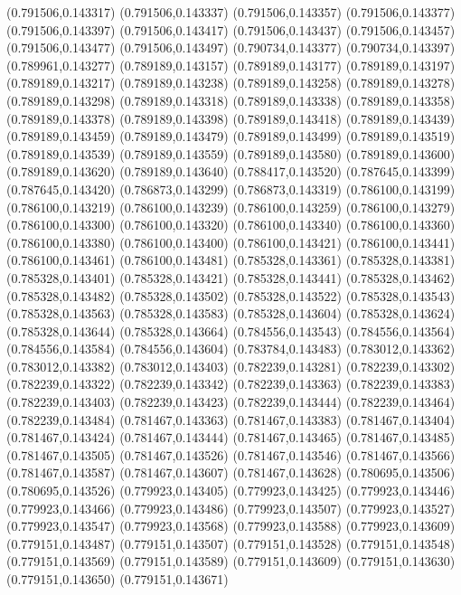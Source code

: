 (0.791506,0.143317)
(0.791506,0.143337)
(0.791506,0.143357)
(0.791506,0.143377)
(0.791506,0.143397)
(0.791506,0.143417)
(0.791506,0.143437)
(0.791506,0.143457)
(0.791506,0.143477)
(0.791506,0.143497)
(0.790734,0.143377)
(0.790734,0.143397)
(0.789961,0.143277)
(0.789189,0.143157)
(0.789189,0.143177)
(0.789189,0.143197)
(0.789189,0.143217)
(0.789189,0.143238)
(0.789189,0.143258)
(0.789189,0.143278)
(0.789189,0.143298)
(0.789189,0.143318)
(0.789189,0.143338)
(0.789189,0.143358)
(0.789189,0.143378)
(0.789189,0.143398)
(0.789189,0.143418)
(0.789189,0.143439)
(0.789189,0.143459)
(0.789189,0.143479)
(0.789189,0.143499)
(0.789189,0.143519)
(0.789189,0.143539)
(0.789189,0.143559)
(0.789189,0.143580)
(0.789189,0.143600)
(0.789189,0.143620)
(0.789189,0.143640)
(0.788417,0.143520)
(0.787645,0.143399)
(0.787645,0.143420)
(0.786873,0.143299)
(0.786873,0.143319)
(0.786100,0.143199)
(0.786100,0.143219)
(0.786100,0.143239)
(0.786100,0.143259)
(0.786100,0.143279)
(0.786100,0.143300)
(0.786100,0.143320)
(0.786100,0.143340)
(0.786100,0.143360)
(0.786100,0.143380)
(0.786100,0.143400)
(0.786100,0.143421)
(0.786100,0.143441)
(0.786100,0.143461)
(0.786100,0.143481)
(0.785328,0.143361)
(0.785328,0.143381)
(0.785328,0.143401)
(0.785328,0.143421)
(0.785328,0.143441)
(0.785328,0.143462)
(0.785328,0.143482)
(0.785328,0.143502)
(0.785328,0.143522)
(0.785328,0.143543)
(0.785328,0.143563)
(0.785328,0.143583)
(0.785328,0.143604)
(0.785328,0.143624)
(0.785328,0.143644)
(0.785328,0.143664)
(0.784556,0.143543)
(0.784556,0.143564)
(0.784556,0.143584)
(0.784556,0.143604)
(0.783784,0.143483)
(0.783012,0.143362)
(0.783012,0.143382)
(0.783012,0.143403)
(0.782239,0.143281)
(0.782239,0.143302)
(0.782239,0.143322)
(0.782239,0.143342)
(0.782239,0.143363)
(0.782239,0.143383)
(0.782239,0.143403)
(0.782239,0.143423)
(0.782239,0.143444)
(0.782239,0.143464)
(0.782239,0.143484)
(0.781467,0.143363)
(0.781467,0.143383)
(0.781467,0.143404)
(0.781467,0.143424)
(0.781467,0.143444)
(0.781467,0.143465)
(0.781467,0.143485)
(0.781467,0.143505)
(0.781467,0.143526)
(0.781467,0.143546)
(0.781467,0.143566)
(0.781467,0.143587)
(0.781467,0.143607)
(0.781467,0.143628)
(0.780695,0.143506)
(0.780695,0.143526)
(0.779923,0.143405)
(0.779923,0.143425)
(0.779923,0.143446)
(0.779923,0.143466)
(0.779923,0.143486)
(0.779923,0.143507)
(0.779923,0.143527)
(0.779923,0.143547)
(0.779923,0.143568)
(0.779923,0.143588)
(0.779923,0.143609)
(0.779151,0.143487)
(0.779151,0.143507)
(0.779151,0.143528)
(0.779151,0.143548)
(0.779151,0.143569)
(0.779151,0.143589)
(0.779151,0.143609)
(0.779151,0.143630)
(0.779151,0.143650)
(0.779151,0.143671)
